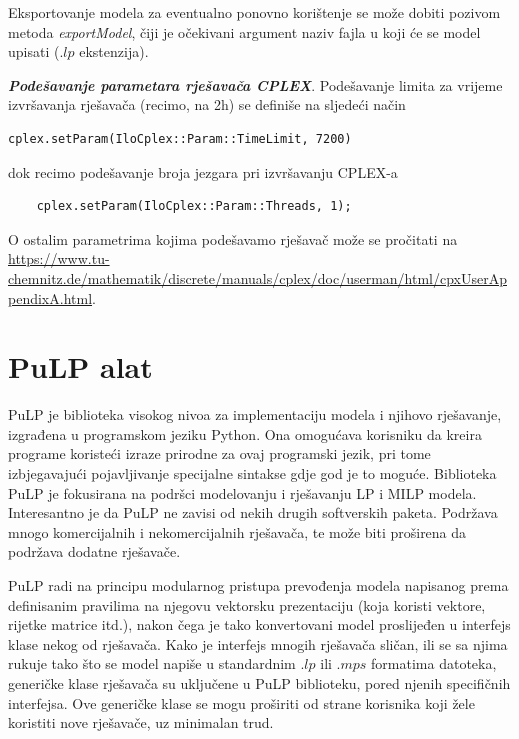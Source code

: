 \documentclass[a4paper, utf8, 11pt, colorlinks]{book}
\begin{document}
Eksportovanje modela za eventualno ponovno korištenje se može dobiti pozivom metoda \emph{exportModel}, čiji je očekivani argument naziv fajla u koji će se model upisati (.$lp$ ekstenzija).  

\emph{\textbf{Podešavanje parametara rješavača CPLEX}}. Podešavanje limita za vrijeme izvršavanja rješavača (recimo, na 2h) se definiše na sljedeći način
\begin{verbatim}
cplex.setParam(IloCplex::Param::TimeLimit, 7200)
\end{verbatim}
dok recimo podešavanje broja jezgara pri izvršavanju CPLEX-a 
\begin{verbatim}
	cplex.setParam(IloCplex::Param::Threads, 1);
\end{verbatim}
O ostalim parametrima kojima podešavamo rješavač može se pročitati na 
\url{https://www.tu-chemnitz.de/mathematik/discrete/manuals/cplex/doc/userman/html/cpxUserAppendixA.html}. 
 \section{PuLP alat}
 PuLP je biblioteka visokog nivoa za implementaciju modela i njihovo rješavanje, izgrađena u programskom jeziku Python.  
 Ona omogućava korisniku da kreira programe koristeći izraze prirodne za ovaj programski jezik,  
 pri tome izbjegavajući pojavljivanje specijalne sintakse gdje god je to moguće. Biblioteka PuLP je fokusirana na podršci modelovanju i rješavanju LP i MILP modela. Interesantno je da PuLP 
 ne zavisi od nekih drugih softverskih paketa.   Podržava mnogo komercijalnih i nekomercijalnih rješavača, te može biti proširena da podržava dodatne rješavače. 
 
 PuLP radi na principu modularnog pristupa prevođenja modela napisanog prema definisanim pravilima na njegovu vektorsku prezentaciju (koja koristi vektore, rijetke matrice itd.), nakon čega je tako konvertovani model proslijeđen u interfejs klase nekog od rješavača. Kako je interfejs mnogih rješavača sličan, ili se sa njima rukuje tako što se model napiše u standardnim .$lp$ ili .$mps$  formatima  datoteka, generičke klase rješavača su uključene  u PuLP biblioteku, pored njenih specifičnih interfejsa.  %
 Ove generičke klase se mogu proširiti od strane korisnika koji žele koristiti nove rješavače, uz minimalan trud.   
 
\end{document}
